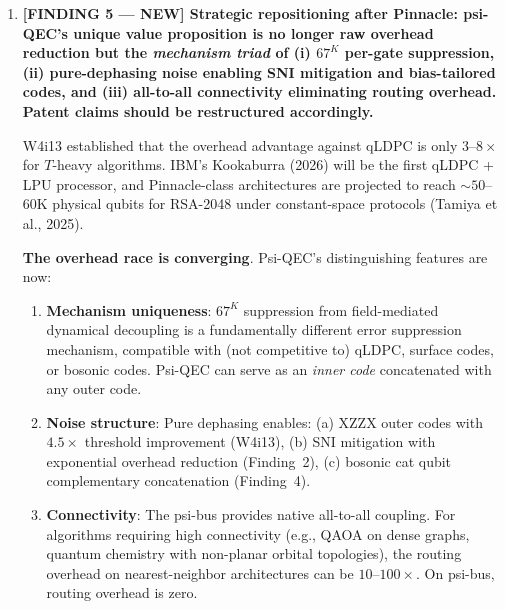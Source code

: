 \documentclass[11pt]{article}
\theoremstyle{definition}
\theoremstyle{remark}
\begin{document}
\begin{tcolorbox}[colback=blue!5!white, colframe=blue!60!black,
  title=\textbf{W4i14 TOP 5 FINDINGS --- READ FIRST}]
\begin{enumerate}[nosep]
\item \textbf{[FINDING 5 --- NEW] Strategic repositioning after Pinnacle:
  psi-QEC's unique value proposition is no longer raw overhead reduction
  but the \emph{mechanism triad} of (i) $67^K$ per-gate suppression,
  (ii) pure-dephasing noise enabling SNI mitigation and bias-tailored
  codes, and (iii) all-to-all connectivity eliminating routing overhead.
  Patent claims should be restructured accordingly.}

  W4i13 established that the overhead advantage against qLDPC is only
  $3$--$8\times$ for $T$-heavy algorithms.  IBM's Kookaburra (2026) will
  be the first qLDPC + LPU processor, and Pinnacle-class architectures
  are projected to reach $\sim 50$--$60$K physical qubits for RSA-2048
  under constant-space protocols (Tamiya et al., 2025).

  \textbf{The overhead race is converging}.  Psi-QEC's distinguishing
  features are now:
  \begin{enumerate}[nosep]
    \item \textbf{Mechanism uniqueness}: $67^K$ suppression from
      field-mediated dynamical decoupling is a fundamentally different
      error suppression mechanism, compatible with (not competitive to)
      qLDPC, surface codes, or bosonic codes.  Psi-QEC can serve as an
      \emph{inner code} concatenated with any outer code.
    \item \textbf{Noise structure}: Pure dephasing enables:
      (a) XZZX outer codes with $4.5\times$ threshold improvement (W4i13),
      (b) SNI mitigation with exponential overhead reduction (Finding~2),
      (c) bosonic cat qubit complementary concatenation (Finding~4).
    \item \textbf{Connectivity}: The psi-bus provides native all-to-all
      coupling.  For algorithms requiring high connectivity (e.g., QAOA on
      dense graphs, quantum chemistry with non-planar orbital topologies),
      the routing overhead on nearest-neighbor architectures can be
      $10$--$100\times$.  On psi-bus, routing overhead is zero.
  \end{enumerate}


\end{enumerate}
\end{tcolorbox}
\end{document}
